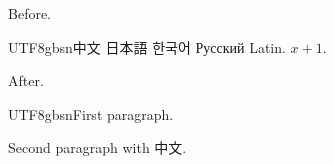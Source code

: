 \documentclass{article}
\begin{document}
Before. \begin{CJK}{UTF8}{gbsn}\selectfont 中文 日本語 한국어 Русский Latin. $x+1$.\end{CJK} After.
\begin{CJK}{UTF8}{gbsn}First paragraph.

Second paragraph with 中文.\end{CJK}
\end{document}
